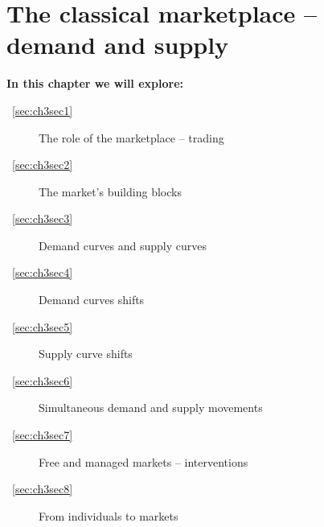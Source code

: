 \chapter{The classical marketplace -- demand and supply} \label{chap:classical}

\begin{topics}
\textbf{In this chapter we will explore:}
\begin{description}
\item [~\ref{sec:ch3sec1}] The role of the marketplace -- trading
\item [~\ref{sec:ch3sec2}] The market's building blocks
\item [~\ref{sec:ch3sec3}] Demand curves and supply curves
\item [~\ref{sec:ch3sec4}] Demand curves shifts
\item [~\ref{sec:ch3sec5}] Supply curve shifts
\item [~\ref{sec:ch3sec6}] Simultaneous demand and supply movements
\item [~\ref{sec:ch3sec7}] Free and managed markets -- interventions
\item [~\ref{sec:ch3sec8}] From individuals to markets
\end{description}
\end{topics}